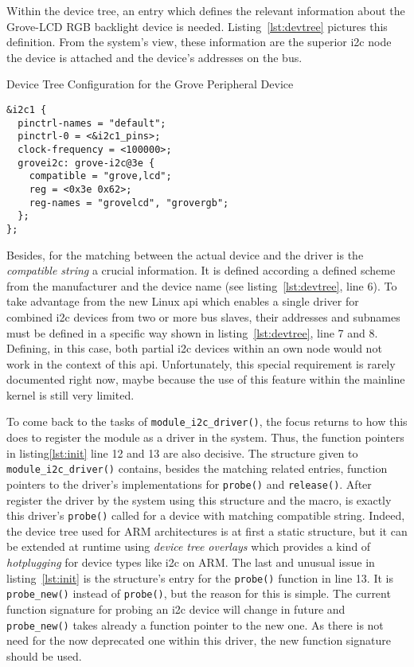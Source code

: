 Within the device tree, an entry which defines the relevant information about the Grove-LCD RGB backlight device is needed.
Listing~\ref{lst:devtree} pictures this definition.
From the system's view, these information are the superior \ac{i2c} node the device is attached and the device's addresses on the bus.

\begin{listing} [ht]
    \caption{Device Tree Configuration for the Grove Peripheral Device}
    \label{lst:devtree}
    \begin{verbatim}
&i2c1 {
  pinctrl-names = "default";
  pinctrl-0 = <&i2c1_pins>;
  clock-frequency = <100000>;
  grovei2c: grove-i2c@3e {
    compatible = "grove,lcd";
    reg = <0x3e 0x62>;
    reg-names = "grovelcd", "grovergb";
  };
};
    \end{verbatim}
\end{listing}

Besides, for the matching between the actual device and the driver is the \textit{compatible string} a crucial information.
It is defined according a defined scheme from the manufacturer and the device name (see listing~\ref{lst:devtree}, line 6).
To take advantage from the new Linux \ac{api} which enables a single driver for combined \ac{i2c} devices from two or more bus slaves, their addresses and subnames must be defined in a specific way shown in listing~\ref{lst:devtree}, line 7 and 8.
Defining, in this case, both partial \ac{i2c} devices within an own node would not work in the context of this \ac{api}.
Unfortunately, this special requirement is rarely documented right now, maybe because the use of this feature within the mainline kernel is still very limited.

To come back to the tasks of \texttt{module_i2c_driver()}, the focus returns to how this does to register the module as a driver in the system.
Thus, the function pointers in listing\ref{lst:init} line 12 and 13 are also decisive.
The structure given to \texttt{module_i2c_driver()} contains, besides the matching related entries, function pointers to the driver's implementations for \texttt{probe()} and \texttt{release()}.
After register the driver by the system using this structure and the macro, is exactly this driver's \texttt{probe()} called for a device with matching compatible string.
Indeed, the device tree used for ARM architectures is at first a static structure, but it can be extended at runtime using \textit{device tree overlays} which provides a kind of \textit{hotplugging} for device types like \ac{i2c} on ARM.
The last and unusual issue in listing~\ref{lst:init} is the structure's entry for the \texttt{probe()} function in line 13.
It is \texttt{probe_new()} instead of \texttt{probe()}, but the reason for this is simple.
The current function signature for probing an \ac{i2c} device will change in future and \texttt{probe_new()} takes already a function pointer to the new one.
As there is not need for the now deprecated one within this driver, the new function signature should be used.

